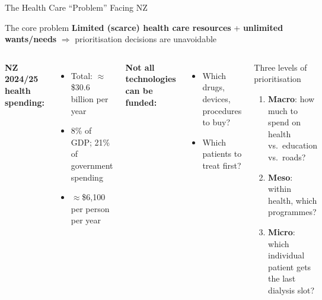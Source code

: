 \documentclass[aspectratio=169, 12pt]{beamer}
\begin{document}
\begin{frame}{The Health Care ``Problem'' Facing NZ}
  \begin{block}{The core problem}
    \textbf{Limited (scarce) health care resources} + \textbf{unlimited wants/needs}
    $\Rightarrow$ prioritisation decisions are unavoidable
  \end{block}
  \vspace{0.4em}
  \begin{columns}
      \textbf{NZ 2024/25 health spending:}
      \begin{itemize}
        \item Total: $\approx$\$30.6 billion per year
        \item 8\% of GDP; 21\% of government spending
        \item $\approx$\$6,100 per person per year
      \end{itemize}
      \vspace{0.4em}
      \textbf{Not all technologies can be funded:}
      \begin{itemize}
        \item Which drugs, devices, procedures to buy?
        \item Which patients to treat first?
      \end{itemize}
      \begin{alertblock}{Three levels of prioritisation}
        \begin{enumerate}
          \item \textbf{Macro}: how much to spend on health vs.\ education vs.\ roads?
          \item \textbf{Meso}: within health, which programmes?
          \item \textbf{Micro}: which individual patient gets the last dialysis slot?
        \end{enumerate}
      \end{alertblock}
  \end{columns}
\end{frame}
\end{document}
